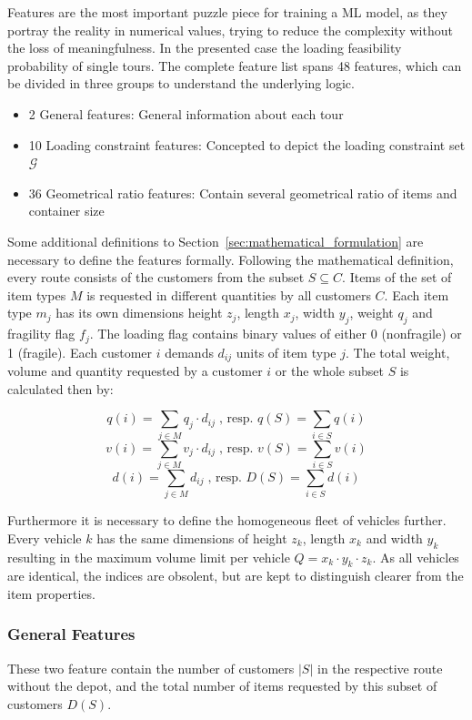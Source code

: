 Features are the most important puzzle piece for training a \gls{ML} model, as they portray the reality in numerical values, trying to
reduce the complexity without the loss of meaningfulness. In the presented case the loading feasibility probability of single tours.
The complete feature list spans 48 features, which can be divided in three groups to understand the underlying logic.

\begin{itemize}
    \item 2 General features: General information about each tour
    \item 10 Loading constraint features: Concepted to depict the loading constraint set $\mathcal{G}$
    \item 36 Geometrical ratio features: Contain several geometrical ratio of items and container size
\end{itemize}

Some additional definitions to Section~\ref{sec:mathematical_formulation}
are necessary to define the features formally. Following the mathematical definition, every route consists of the customers
from the subset $S \subseteq C$. Items of the set of item types $M$ is requested in different quantities by all customers $C$.
Each item type $m_j$ has its own dimensions height $z_j$, length $x_j$, width $y_j$, weight $q_j$ and fragility flag $f_j$.
The loading flag contains binary values of either 0 (nonfragile) or 1 (fragile).
Each customer $i$ demands $d_{ij}$ units of item type $j$.
The total weight, volume and quantity requested by a customer $i$ or the whole subset $S$ is calculated then by:

\[q(i) = \sum_{j \in M} q_j \cdot d_{ij}\;\text{, resp. } q(S) = \sum_{i\in S} q(i)\]
\[v(i) = \sum_{j \in M} v_j \cdot d_{ij}\;\text{, resp. } v(S) = \sum_{i\in S} v(i)\]
\[d(i) = \sum_{j \in M} d_{ij}\;\text{, resp. } D(S) = \sum_{i\in S} d(i)\]

Furthermore it is necessary to define the homogeneous fleet of vehicles
further. Every vehicle $k$ has the same dimensions of height $z_k$, length $x_k$ and width $y_k$ resulting in the maximum volume limit per
vehicle $Q = x_k \cdot y_k\cdot z_k$. As all vehicles are identical, the indices are obsolent, but are kept to distinguish clearer
from the item properties.

\subsubsection{General Features}
These two feature contain the number of customers $|S|$ in the respective route without the depot, and the total number of items requested by
this subset of customers $D(S)$.

